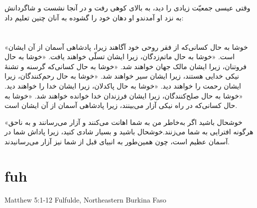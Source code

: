 \documentclass[12pt,fleqn,titlepage,twoside,a4paper]{book}
\begin{document}
\begin{arab}[utf]
\section*{}


وقتی عیسی جمعیّت زیادی را دید، به بالای كوهی رفت و در آنجا نشست و شاگردانش به نزد او آمدندو او دهان خود را گشوده به آنان چنین تعلیم داد:

\section*{}

«خوشا به حال کسانی‌که از فقر روحی خود آگاهند
زیرا، پادشاهی آسمان از آن ایشان است.
«خوشا به حال ماتم‌زدگان،
زیرا ایشان تسلّی خواهند یافت.
«خوشا به حال فروتنان،
زیرا ایشان مالک جهان خواهند شد.
«خوشا به حال کسانی‌که گرسنه و تشنهٔ نیكی خدایی هستند،
زیرا ایشان سیر خواهند شد.
«خوشا به حال رحم‌كنندگان،
زیرا ایشان رحمت را خواهند دید.
«خوشا به حال پاکدلان،
زیرا ایشان خدا را خواهند دید.
«خوشا به حال صلح‌كنندگان،
زیرا ایشان فرزندان خدا خوانده خواهند شد.
«خوشا به حال کسانی‌که در راه نیكی آزار می‌بینند،
زیرا پادشاهی آسمان از آن ایشان است.

«خوشحال باشید اگر به‌خاطر من به شما اهانت می‌کنند و آزار می‌رسانند و به ناحق هرگونه افترایی به شما می‌زنند.خوشحال باشید و بسیار شادی كنید، زیرا پاداش شما در آسمان عظیم است، چون همین‌طور به انبیای قبل از شما نیز آزار می‌رسانیدند.
\end{arab}


\section{fuh}

Matthew 5:1-12 Fulfulde, Northeastern Burkina Faso
\end{document}
